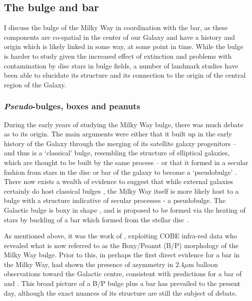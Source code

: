 \subsection{The bulge and bar}

I discuss the bulge of the Milky Way in coordination with the bar, as these components are co-spatial in the center of our Galaxy and have a history and origin which is likely linked in some way, at some point in time. While the bulge is harder to study given the increased effect of extinction and problems with contamination by disc stars in bulge fields, a number of landmark studies have been able to elucidate its structure and its connection to the origin of the central region of the Galaxy.

\subsubsection{\emph{Pseudo}-bulges, boxes and peanuts}
During the early years of studying the Milky Way bulge, there was much debate as to its origin. The main arguments were either that it built up in the early history of the Galaxy through the merging of its satellite galaxy progenitors -- and thus is a `classical' bulge, resembling the structure of elliptical galaxies, which are thought to be built by the same process -- or that it formed in a secular fashion from stars in the disc or bar of the galaxy to become a `pseudobulge' \citep[a useful summary of these definitions is provided in Section 1.1 of][]{2004ARA&A..42..603K}. There now exists a wealth of evidence to suggest that while external galaxies certainly do host classical bulges \citep[e.g.][]{2009MNRAS.393.1531G}, the Milky Way itself is more likely host to a bulge with a structure indicative of secular processes - a pseudobulge. The Galactic bulge is boxy in shape \citep[e.g][]{1995ApJ...445..716D}, and is proposed to be formed via the heating of stars by buckling of a bar which formed from the stellar disc \citep[e.g.][]{1981A&A....96..164C,1991Natur.352..411R}.

As mentioned above, it was the work of \citet{1995ApJ...445..716D}, exploiting COBE infra-red data who revealed what is now referred to as the Boxy/Peanut (B/P) morphology of the Milky Way bulge. Prior to this, in perhaps the first direct evidence for a bar in the Milky Way, \citet{1991ApJ...379..631B} had shown the presence of asymmetry in $2.4 \mu$m balloon observations \citep{1982AIPC...83...48M} toward the Galactic centre, consistent with predictions for a bar of \citet{1979A&AS...37..403S} and \citet{1980ApJ...236..779L}. This broad picture of a B/P bulge plus a bar has prevailed to the present day, although the exact nuances of its structure are still the subject of debate.

